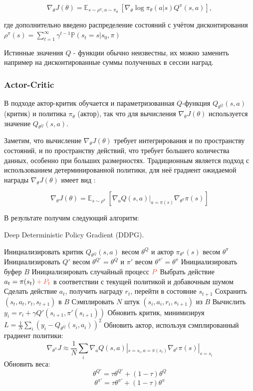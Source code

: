 \documentclass[14pt]{extarticle}
\begin{document}
$$ \nabla_{\theta} J(\theta) = \mathbb{E}_{s\sim \rho^{\pi}, a\sim \pi_{\theta}} \ \left[\nabla_{\theta} \log \pi_{\theta} (a|s) Q^{\pi}(s, a)\right],$$

где дополнительно введено распределение состояний с учётом дисконтирования $\rho^{\pi}(s) = \sum\limits_{t=1}^{\infty} \gamma^{t-1} \mathbb{P} (s_t=s|s_0, \pi)$

Истинные значения $Q$ - функции обычно неизвестны, их можно заменить например на дисконтированные суммы полученных в сессии наград.

\subsubsection{Actor-Critic}

В подходе актор-критик обучается и параметризованная $Q$-функция $Q_{\theta^Q}(s, a)$ (критик) и политика $\pi_{\theta}$ (актор), так что для вычисления $\nabla_{\theta} J(\theta)$ используется значение $Q_{\theta^Q}(s, a)$.

Заметим, что вычисление $\nabla_{\theta} J(\theta)$ требует интегрирования и по пространству состояний, и по пространству действий, что требует большего количества данных, особенно при больших размерностях. Традиционным является подход с использованием детерминированной политики, для неё градиент ожидаемой награды $\nabla_{\theta} J(\theta)$ имеет вид \cite{dpg}:

$$ \nabla_{\theta} J(\theta) = \mathbb{E}_{s\sim \rho^{\pi}} \ \left[ \nabla_a Q(s, a)|_{a = \pi(s)}\nabla_{\theta^{\pi}} \pi (s)\right]$$

В результате получим следующий алгоритм:

\begin{algorithm}[H]
\caption{{Deep Deterministic Policy Gradient (DDPG).}}
\label{alg}
\begin{algorithmic}[1]
\STATE Инициализировать критик $Q_{\theta^{Q}}(s, a)$ весом $\theta^{Q}$ и актор $\pi_{\theta^{\pi}}(s)$ весом $\theta^{\pi}$
\STATE Инициализировать $Q'$ весом $\theta^{Q'} = \theta^{Q}$ и $\pi'$ весом $\theta^{\pi '} = \theta^{\pi}$
\STATE Инициализировать буфер $B$
\STATE Инициализировать случайный процесс $\textcolor{RedOrange}{P}$
\STATE Выбрать действие $a_t = \pi(s_t) \mathbin{\textcolor{RedOrange}{+}} \textcolor{RedOrange}{P_t}$ в соответствии с текущей политикой и добавочным шумом 
\STATE Сделать действие $a_t$, получить награду $r_t$, перейти в состояние $s_{t+1}$
\STATE Сохранить $(s_t, a_t, r_t, s_{t+1})$ в $B$
\STATE Сэмплировать $N$ штук $(s_i, a_i, r_i, s_{i+1})$ из $B$
\STATE Вычислить $y_i = r_i + \gamma Q'(s_{i+1}, \pi'(s_{i+1}))$
\STATE Обновить критик, минимизируя $L=\frac{1}{N}\sum\limits_i \left(y_i - Q_{\theta^{Q}}(s_i, a_i)\right)^2$
\STATE Обновить актор, используя сэмплированный градиент политики:
$$\nabla_{\theta^{\pi}} J \approx \frac{1}{N} \sum\limits_i \nabla_a Q(s, a)|_{s=s_i, a = \pi(s_i)}\nabla_{\theta^{\pi}} \pi (s)|_{s=s_i}$$
\STATE Обновить веса:
$$\theta^{Q'} = \tau \theta^{Q'} + (1-\tau) \theta^{Q}$$ $$\theta^{\pi'} = \tau \theta^{\pi'} + (1-\tau) \theta^{\pi}$$
\ENDFOR
\ENDFOR
\end{algorithmic}
\end{algorithm}
\end{document}
